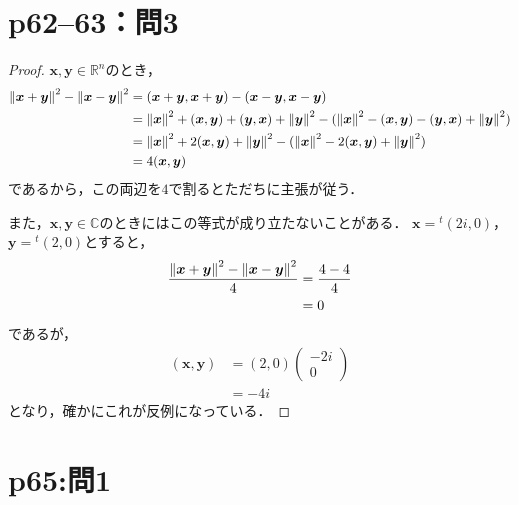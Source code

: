 \documentclass[a4paper,10pt,fleqn]{ltjsarticle}
\begin{document}
\section*{p62--63：問3}

\begin{tleftbar}
  \begin{proof}
    $\bm{x},\bm{y} \in \mathbb{R}^n$のとき，
    \begin{align*}
      \norm{\bm{x}+\bm{y}}^2 - \norm{\bm{x}-\bm{y}}^2 & = (\bm{x}+\bm{y},\bm{x}+\bm{y}) - (\bm{x}-\bm{y},\bm{x}-\bm{y})                                                                          \\
                                                      & = \norm{\bm{x}}^2 +(\bm{x},\bm{y})+(\bm{y},\bm{x})+ \norm{\bm{y}}^2 - (\norm{\bm{x}}^2 -(\bm{x},\bm{y})-(\bm{y},\bm{x})+\norm{\bm{y}}^2) \\
                                                      & = \norm{\bm{x}}^2 + 2(\bm{x},\bm{y}) + \norm{\bm{y}}^2 - (\norm{\bm{x}}^2 - 2(\bm{x},\bm{y}) + \norm{\bm{y}}^2)                          \\
                                                      & = 4(\bm{x},\bm{y})
    \end{align*}
    であるから，この両辺を$4$で割るとただちに主張が従う．

    また，$\bm{x},\bm{y} \in \mathbb{C}$のときにはこの等式が成り立たないことがある．
    $\bm{x}={}^t (2i,0)$，$\bm{y}={}^t (2,0)$とすると，
    \begin{align*}
      \frac{\norm{\bm{x}+\bm{y}}^2 - \norm{\bm{x}-\bm{y}}^2 }{4} & = \frac{4-4}{4} \\
                                                                 & =0
    \end{align*}
    であるが，
    \begin{align*}
      (\bm{x},\bm{y}) & =(2,0) \begin{pmatrix} -2i  \\ 0 \end{pmatrix} \\
                      & = -4i
    \end{align*}
    となり，確かにこれが反例になっている．
  \end{proof}
\end{tleftbar}

\newpage

\section*{p65:問1}
\end{document}
